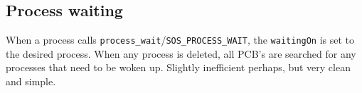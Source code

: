 \documentclass[12pt,english]{article}
\begin{document}
\subsection{Process waiting}

When a process calls \texttt{process\_wait}/\texttt{SOS\_PROCESS\_WAIT}, the \texttt{waitingOn} is set to the desired process.  When any process is deleted, all PCB's are searched for any processes that need to be woken up.  Slightly inefficient perhaps, but very clean and simple.
\end{document}
